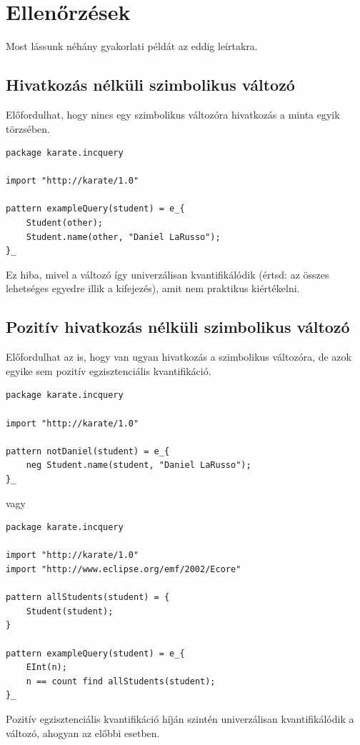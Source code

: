 
\section{Ellenőrzések}

Most lássunk néhány gyakorlati példát az eddig leírtakra.

\subsection{Hivatkozás nélküli szimbolikus változó}

Előfordulhat, hogy nincs egy szimbolikus változóra hivatkozás a minta egyik törzsében.

\begin{lstlisting}
package karate.incquery

import "http://karate/1.0"

pattern exampleQuery(student) = e_{
    Student(other);
    Student.name(other, "Daniel LaRusso");
}_
\end{lstlisting}
%
Ez hiba, mivel a változó így univerzálisan kvantifikálódik (értsd: az összes lehetséges egyedre illik a kifejezés), amit nem praktikus kiértékelni.

\subsection{Pozitív hivatkozás nélküli szimbolikus változó}

Előfordulhat az is, hogy van ugyan hivatkozás a szimbolikus változóra, de azok egyike sem pozitív egzisztenciális kvantifikáció.

\begin{lstlisting}
package karate.incquery

import "http://karate/1.0"

pattern notDaniel(student) = e_{
    neg Student.name(student, "Daniel LaRusso");
}_
\end{lstlisting}
%
%
vagy
%
\begin{lstlisting}
package karate.incquery

import "http://karate/1.0"
import "http://www.eclipse.org/emf/2002/Ecore"

pattern allStudents(student) = {
    Student(student);
}

pattern exampleQuery(student) = e_{
    EInt(n);
    n == count find allStudents(student);
}_
\end{lstlisting}
%
%
Pozitív egzisztenciális kvantifikáció híján szintén univerzálisan kvantifikálódik a változó, ahogyan az előbbi esetben.

